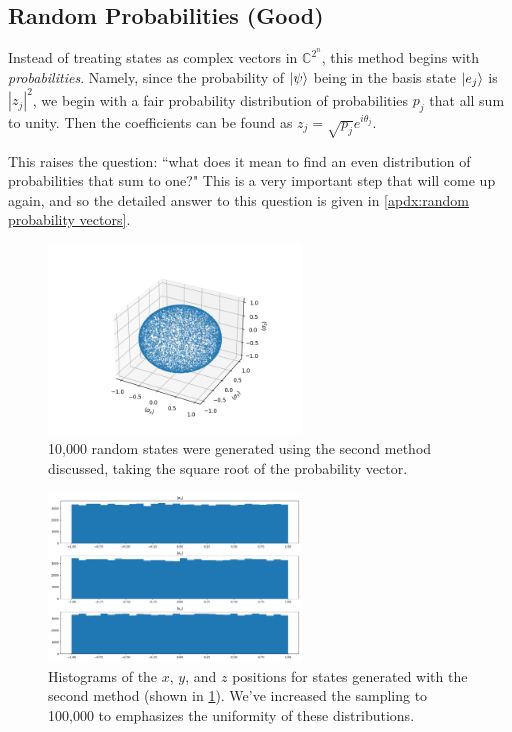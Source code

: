 \documentclass{paper}[11pt]
\begin{document}
	\subsection{Random Probabilities (Good)}
	
	Instead of treating states as complex vectors in $\mathbb{C}^{2^n}$, this method begins with \textit{probabilities}. Namely, since the probability of $\ket{\psi}$ being in the basis state $\ket{e_j}$ is $|z_j|^2$, we begin with a fair probability distribution of probabilities $p_j$ that all sum to unity. Then the coefficients can be found as $z_j=\sqrt{p_j}e^{i\theta_j}$.
	
	This raises the question: ``what does it mean to find an even distribution of probabilities that sum to one?" This is a very important step that will come up again, and so the detailed answer to this question is given in \cref{apdx:random probability vectors}.

	\begin{figure}
		\centering
		\includegraphics[width=0.6\textwidth]{method2_pure_bloch_sphere.png}
		\caption{10,000 random states were generated using the second method discussed, taking the square root of the probability vector.}
		\label{fig:method2_pure_bloch_sphere}
	\end{figure}
	\begin{figure}
		\centering
		\includegraphics[width=0.6\textwidth]{method2_pure_histograms.png}
		\caption{Histograms of the $x$, $y$, and $z$ positions for states generated with the second method (shown in \cref{fig:method2_pure_bloch_sphere}). We've increased the sampling to 100,000 to emphasizes the uniformity of these distributions.}
		\label{fig:method2_pure_hists}
	\end{figure}
	
\end{document}

